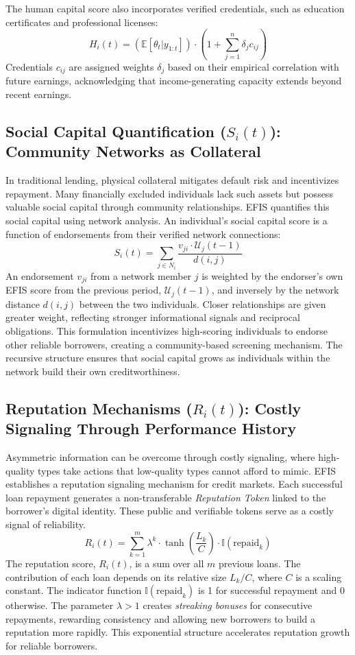 \documentclass{article}
\begin{document}
The human capital score also incorporates verified credentials, such as education certificates and professional licenses:
$$
H_i(t) = \left( \mathbb{E}[\theta_t | y_{1:t}] \right) \cdot \left(1 + \sum_{j=1}^{n} \delta_j c_{ij} \right)
$$
Credentials $c_{ij}$ are assigned weights $\delta_j$ based on their empirical correlation with future earnings, acknowledging that income-generating capacity extends beyond recent earnings.

\subsection{Social Capital Quantification ($S_i(t)$): Community Networks as Collateral}

In traditional lending, physical collateral mitigates default risk and incentivizes repayment. Many financially excluded individuals lack such assets but possess valuable social capital through community relationships. EFIS quantifies this social capital using network analysis. An individual's social capital score is a function of endorsements from their verified network connections:
$$
S_i(t) = \sum_{j \in N_i} \frac{v_{ji} \cdot \mathcal{U}_j(t-1)}{d(i,j)}
$$
An endorsement $v_{ji}$ from a network member $j$ is weighted by the endorser's own EFIS score from the previous period, $\mathcal{U}_j(t-1)$, and inversely by the network distance $d(i,j)$ between the two individuals. Closer relationships are given greater weight, reflecting stronger informational signals and reciprocal obligations. This formulation incentivizes high-scoring individuals to endorse other reliable borrowers, creating a community-based screening mechanism. The recursive structure ensures that social capital grows as individuals within the network build their own creditworthiness.

\subsection{Reputation Mechanisms ($R_i(t)$): Costly Signaling Through Performance History}

Asymmetric information can be overcome through costly signaling, where high-quality types take actions that low-quality types cannot afford to mimic. EFIS establishes a reputation signaling mechanism for credit markets. Each successful loan repayment generates a non-transferable \textit{Reputation Token} linked to the borrower's digital identity. These public and verifiable tokens serve as a costly signal of reliability.
$$
R_i(t) = \sum_{k=1}^{m} \lambda^k \cdot \tanh\left(\frac{L_k}{C}\right) \cdot \mathbb{I}(\text{repaid}_k)
$$
The reputation score, $R_i(t)$, is a sum over all $m$ previous loans. The contribution of each loan depends on its relative size $L_k/C$, where $C$ is a scaling constant. The indicator function $\mathbb{I}(\text{repaid}_k)$ is 1 for successful repayment and 0 otherwise. The parameter $\lambda > 1$ creates \textit{streaking bonuses} for consecutive repayments, rewarding consistency and allowing new borrowers to build a reputation more rapidly. This exponential structure accelerates reputation growth for reliable borrowers.
\end{document}
